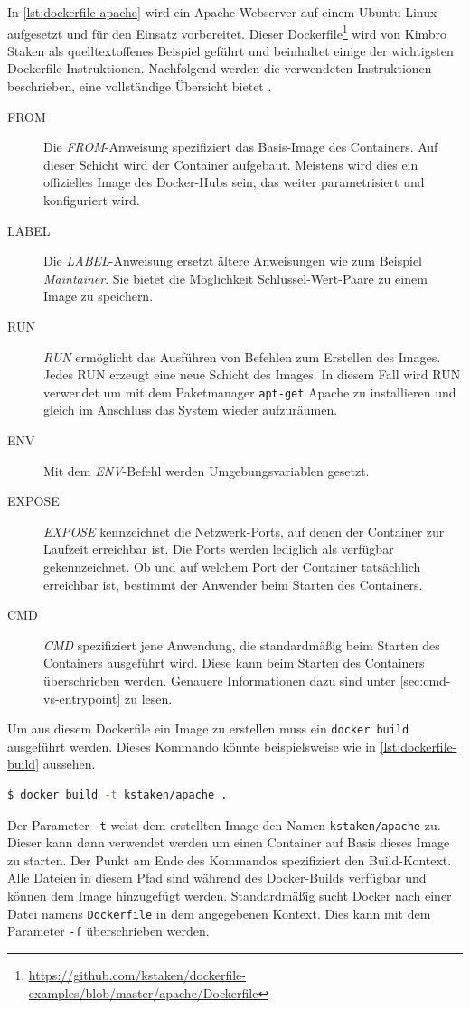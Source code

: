 
In \cref{lst:dockerfile-apache} wird ein Apache-Webserver auf einem Ubuntu-Linux aufgesetzt und für den Einsatz vorbereitet.
Dieser Dockerfile\footnote{\url{https://github.com/kstaken/dockerfile-examples/blob/master/apache/Dockerfile}} wird von Kimbro Staken als quelltextoffenes Beispiel geführt und beinhaltet einige der wichtigsten Dockerfile-Instruktionen.
Nachfolgend werden die verwendeten Instruktionen beschrieben, eine vollständige Übersicht bietet \autocite{docker-dockerfile:online}.
\begin{description}
    \item[FROM] Die \emph{FROM}-Anweisung spezifiziert das Basis-Image des Containers. Auf dieser Schicht wird der Container aufgebaut. Meistens wird dies ein offizielles Image des Docker-Hubs sein, das weiter parametrisiert und konfiguriert wird.
    \item[LABEL] Die \emph{LABEL}-Anweisung ersetzt ältere Anweisungen wie zum Beispiel \emph{Maintainer}. Sie bietet die Möglichkeit Schlüssel-Wert-Paare zu einem Image zu speichern.
    \item[RUN] \emph{RUN} ermöglicht das Ausführen von Befehlen zum Erstellen des Images. Jedes RUN erzeugt eine neue Schicht des Images. In diesem Fall wird RUN verwendet um mit dem Paketmanager \texttt{apt-get} Apache zu installieren und gleich im Anschluss das System wieder aufzuräumen.
    \item[ENV] Mit dem \emph{ENV}-Befehl werden Umgebungsvariablen gesetzt.
    \item[EXPOSE] \emph{EXPOSE} kennzeichnet die Netzwerk-Ports, auf denen der Container zur Laufzeit erreichbar ist. Die Ports werden lediglich als verfügbar gekennzeichnet. Ob und auf welchem Port der Container tatsächlich erreichbar ist, bestimmt der Anwender beim Starten des Containers.
    \item[CMD] \emph{CMD} spezifiziert jene Anwendung, die standardmäßig beim Starten des Containers ausgeführt wird. Diese kann beim Starten des Containers überschrieben werden. Genauere Informationen dazu sind unter \cref{sec:cmd-vs-entrypoint} zu lesen.
\end{description}

Um aus diesem Dockerfile ein Image zu erstellen muss ein \texttt{docker build} ausgeführt werden.
Dieses Kommando könnte beispielsweise wie in \cref{lst:dockerfile-build} aussehen.

\begin{lstlisting}[caption=Erstellen eines Images auf Basis eines Dockerfiles, language=bash, label=lst:dockerfile-build]
    $ docker build -t kstaken/apache .
\end{lstlisting}
Der Parameter \texttt{-t} weist dem erstellten Image den Namen \texttt{kstaken/apache} zu.
Dieser kann dann verwendet werden um einen Container auf Basis dieses Image zu starten.
Der Punkt am Ende des Kommandos spezifiziert den Build-Kontext.
Alle Dateien in diesem Pfad sind während des Docker-Builds verfügbar und können dem Image hinzugefügt werden.
Standardmäßig sucht Docker nach einer Datei namens \texttt{Dockerfile} in dem angegebenen Kontext.
Dies kann mit dem Parameter \texttt{-f} überschrieben werden.

